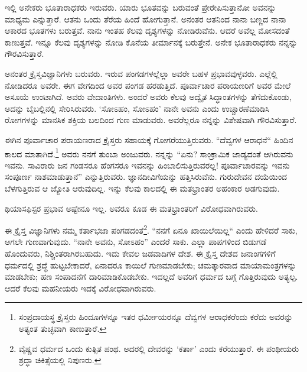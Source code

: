 \vspace{0.13cm}

ಇಲ್ಲಿ ಅನೇಕರು ಭೂತಾರಾಧಕರು ಇರುವರು. ಯಾರು ಭೂತವನ್ನು ಬರುವಂತೆ ಪ್ರೇರೇಪಿಸುತ್ತಾನೋ ಅವನನ್ನು ಮಾಧ್ಯಮ ಎನ್ನುತ್ತಾರೆ. ಆತನು ಒಂದು ತೆರೆಯ ಹಿಂದೆ ಹೋಗುತ್ತಾನೆ. ಅನಂತರ ಆತನಿಂದ ನಾನಾ ಬಣ್ಣದ ನಾನಾ ಆಕಾರದ ಭೂತಗಳು ಬರುತ್ತವೆ. ನಾನು ಇಂತಹ ಕೆಲವು ದೃಶ್ಯಗಳನ್ನು ನೋಡಿರುವೆನು. ಆದರೆ ಅವೆಲ್ಲ ಮೋಸದಂತೆ ಕಾಣುತ್ತವೆ. ಇನ್ನೂ ಕೆಲವು ದೃಶ್ಯಗಳನ್ನು ನೋಡಿ ಕೊನೆಯ ತೀರ್ಮಾನಕ್ಕೆ ಬರುತ್ತೇನೆ. ಅನೇಕ ಭೂತಾರಾಧಕರು ನನ್ನನ್ನು ಗೌರವಿಸುತ್ತಾರೆ.

\vspace{0.13cm}

ಅನಂತರ ಕ್ರೈಸ್ತವಿಜ್ಞಾನಿಗಳು ಬರುವರು. ಇರುವ ಪಂಗಡಗಳಲ್ಲೆಲ್ಲಾ ಅವರೇ ಬಹಳ ಪ್ರಭಾವವುಳ್ಳವರು. ಎಲ್ಲೆಲ್ಲಿ ನೋಡಿದರೂ ಅವರೇ. ಈಗ ವೇಗದಿಂದ ಅವರ ಪಂಗಡ ಹರಡುತ್ತಿದೆ. ಪೂರ್ವಾಚಾರ ಪರಾಯಣರಿಗೆ ಅವರ ಮೇಲೆ ಅಸೂಯೆ ಉಂಟಾಗಿದೆ. ಅವರು ವೇದಾಂತಿಗಳು. ಅಂದರೆ ಅವರು ಕೆಲವು ಅದ್ವೈತ ಸಿದ್ಧಾಂತಗಳನ್ನು ತೆಗೆದುಕೊಂಡು, ಅದನ್ನು ಬೈಬಲ್ಲಿನಲ್ಲಿ ಸೇರಿಸಿರುವರು. ‘ಸೋಽಹಂ, ಸೋಽಹಂ’ \enginline{-} ನಾನೇ ಅವನು \enginline{-} ಎಂದು ಉಚ್ಚಾರಣೆಮಾಡಿಸಿ ರೋಗಗಳನ್ನು ಮಾನಸಿಕ ಶಕ್ತಿಯ ಬಲದಿಂದ ಗುಣ ಮಾಡುವರು. ಅವರೆಲ್ಲರೂ ನನ್ನನ್ನು ವಿಶೇಷವಾಗಿ ಗೌರವಿಸುತ್ತಾರೆ.

\vspace{0.13cm}

ಈಗಿನ ಪೂರ್ವಾಚಾರ ಪರಾಯಣರಾದ ಕ್ರೈಸ್ತರು ಸಹಾಯಕ್ಕೆ ಗೋಗರೆಯುತ್ತಿರುವರು. “ದೆವ್ವಗಳ ಆರಾಧನೆ“ ಹಿಂದಿನ ಕಾಲದ ಮಾತಾಗಿದೆ.\footnote{ಸಂಪ್ರದಾಯಸ್ಥ ಕ್ರೈಸ್ತರು ಹಿಂದೂಗಳನ್ನೂ ಇತರ ಧರ್ಮೀಯರನ್ನೂ ದೆವ್ವಗಳ ಆರಾಧಕರೆಂದು ಕರೆದು ಅವರನ್ನು ಅತ್ಯಂತ ತುಚ್ಛವಾಗಿ ಕಾಣುತ್ತಾರೆ.} ಅವರು ನನಗೆ ತುಂಬಾ ಅಂಜುವರು. ನನ್ನನ್ನು “ಏನು? ಸಾಂಕ್ರಾಮಿಕ ಜಾಡ್ಯದಂತೆ ಆಗಿರುವನು ಇವನು. ಸಾವಿರಾರು ಜನ ಗಂಡಸರೂ ಹೆಂಗಸರೂ ಇವನನ್ನು ಹಿಂಬಾಲಿಸುತ್ತಿರುವರಲ್ಲ! ಪೂರ್ವಾಚಾರವನ್ನು ಇವನು ಸಂಪೂರ್ಣ ನಾಶಮಾಡುತ್ತಾನೆ” ಎನ್ನುತ್ತಿರುವರು. ಜ್ಞಾನದೀವಿಗೆಯನ್ನು ಹತ್ತಿಸಿರುವೆನು. ಗುರುದೇವನ ದಯೆಯಿಂದ ಬೆಳಗುತ್ತಿರುವ ಆ ಜ್ಯೋತಿ ಆರುವುದಿಲ್ಲ. ಇನ್ನು 
ಕೆಲವು ಕಾಲದಲ್ಲಿ ಈ ಮತಭ್ರಾಂತರ ಅಹಂಕಾರ ಅಡಗುವುದು.

\vspace{0.13cm}

ಥಿಯಾಸಫಿಸ್ಟರ ಪ್ರಭಾವ ಅಷ್ಟೇನೂ ಇಲ್ಲ. ಅವರೂ ಕೂಡ ಈ ಮತಭ್ರಾಂತರಿಗೆ ವಿರೋಧವಾಗಿರುವರು.

\newpage

ಈ ಕ್ರೈಸ್ತ ವಿಜ್ಞಾನಿಗಳು ನಮ್ಮ ಕರ್ತಾಭಜಾ ಪಂಗಡದಂತೆ\footnote{ವೈಷ್ಣವ ಧರ್ಮದ ಒಂದು ಕುತ್ಸಿತ ಪಂಥ. ಅದರಲ್ಲಿ ದೇವರನ್ನು ‘ಕರ್ತಾ’ ಎಂದು ಕರೆಯುತ್ತಾರೆ. ಈ ಪಂಥೀಯರು ಶ್ರದ್ಧಾ \enginline{-} ಚಿಕಿತ್ಸೆಯಲ್ಲಿ ನಿಪುಣರು.}. “ನನಗೆ ಏನೂ ಖಾಯಿಲೆಯಿಲ್ಲ“ ಎಂದು ಹೇಳಿದರೆ ಸಾಕು, ಆಗಲೇ ಗುಣವಾಗುವುದು. “ನಾನೇ ಅವನು, ಸೋಽಹಂ” ಎಂದರೆ ಸಾಕು. ಎಲ್ಲಾ ಪಾಪಗಳಿಂದ ಬಿಡುಗಡೆ ಹೊಂದುವರು, ನಿಶ್ಚಿಂತರಾಗಿರಬಹುದು. ಇದು ಕೇವಲ ಜಡವಾದಿಗಳ ದೇಶ. ಈ ಕ್ರೈಸ್ತ ದೇಶದ ಜನಾಂಗಗಳಿಗೆ ಧರ್ಮದಲ್ಲಿ ಶ್ರದ್ಧೆ ಹುಟ್ಟಬೇಕಾದರೆ, ಏನಾದರೂ ಕಾಯಿಲೆ ಗುಣಮಾಡಬೇಕು; ಚಮತ್ಕಾರವಾದ ಮಾಯಾಮಂತ್ರಗಳನ್ನು ಮಾಡಬೇಕು; ಹಣ ಸಂಪಾದನೆಗೆ ದಾರಿಮಾಡಿಕೊಡಬೇಕು. ಇದಲ್ಲದೆ ಅವರಿಗೆ ಧರ್ಮದ ಬಗ್ಗೆ ಗೊತ್ತಿರುವುದು ಅತ್ಯಲ್ಪ. ಆದರೆ ಕೆಲವು ಮಹನೀಯರು ಇದಕ್ಕೆ ವಿರೋಧವಾಗಿರುವರು.

